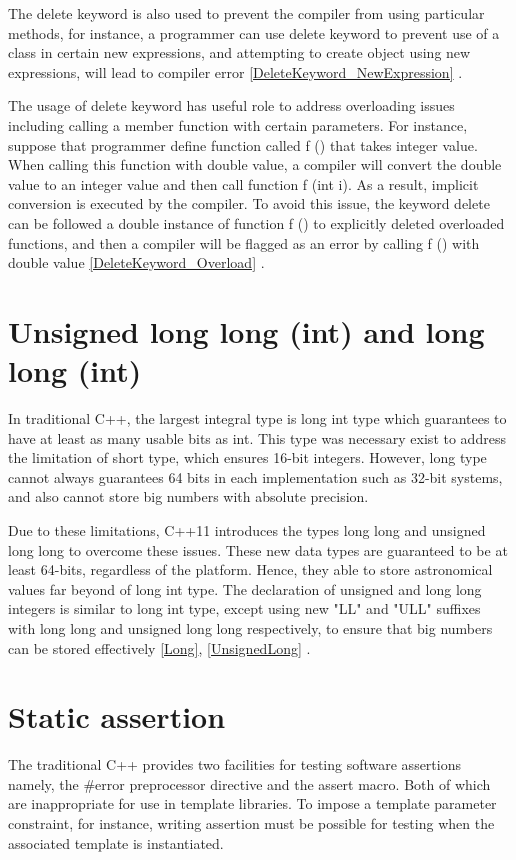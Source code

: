 \documentclass[11pt]{report}
\begin{document}
The delete keyword is also used to prevent the compiler from using particular methods, for instance, a programmer can use delete keyword to prevent use of a class in certain new expressions, and attempting to create object using new expressions, will lead to compiler error \ref{DeleteKeyword_NewExpression} \cite{ISO:2011:Cpplanguage}.


The usage of delete keyword has useful role to address overloading issues including calling a member function with certain parameters.  For instance, suppose that programmer define function called f () that takes integer value. When calling this function with double value, a compiler will convert the double value to an integer value and then call function f (int i). As a result, implicit conversion is executed by the compiler. To avoid this issue, the keyword delete can be followed a double instance of function f () to explicitly deleted overloaded functions, and then a compiler will be flagged as an error by calling f () with double value \ref{DeleteKeyword_Overload} \cite{Gregorie:professionalcpp}.

\section{Unsigned long long (int) and long long (int)}
\label{section: Unsigned and long long (int)}
In traditional C++, the largest integral type is long int type which guarantees to have at least as many usable bits as int.  This type was necessary exist to address the limitation of short type, which ensures 16-bit integers. However, long type cannot always guarantees 64 bits in each implementation such as 32-bit systems, and also cannot store big numbers with absolute precision.


 Due to these limitations, C++11 introduces the types long long and unsigned long long to overcome these issues. These new data types are guaranteed to be at least 64-bits, regardless of the platform. Hence, they able to store astronomical values far beyond of long int type. The declaration of unsigned and long long integers is similar to long int type, except using new "LL" and "ULL" suffixes with long long and unsigned long long respectively, to ensure that big numbers can be stored effectively \ref{Long}, \ref{UnsignedLong} \cite{Overland:2011:CWF}.

\section{Static assertion}
\label{section: Static assertion}
The traditional C++ provides two facilities for testing software assertions namely, the \#error preprocessor directive and the assert macro. Both of which are inappropriate for use in template libraries.  To impose a template parameter constraint, for instance, writing assertion must be possible for testing when the associated template is instantiated.
\end{document}
